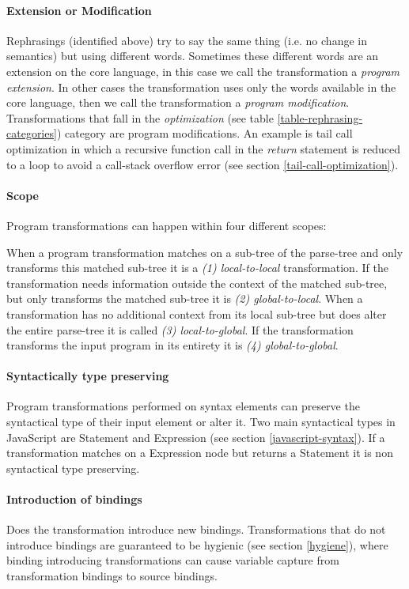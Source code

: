 \paragraph{Extension or Modification}
Rephrasings (identified above) try to say the same thing (i.e. no change in semantics) but using different words\cite{Visser2001}. Sometimes these different words are an extension on the core language, in this case we call the transformation a \textit{program extension}. In other cases the transformation uses only the words available in the core language, then we call the transformation a \textit{program modification}. Transformations that fall in the \textit{optimization} (see table \ref{table-rephrasing-categories}) category are program modifications. An example is tail call optimization in which a recursive function call in the \textit{return} statement is reduced to a loop to avoid a call-stack overflow error (see section \ref{tail-call-optimization}). 

\paragraph{Scope}
Program transformations can happen within four different scopes: 

When a program transformation matches on a sub-tree of the parse-tree and only transforms this matched sub-tree it is a \textit{(1) local-to-local} transformation. If the transformation needs information outside the context of the matched sub-tree, but only transforms the matched sub-tree it is \textit{(2) global-to-local}. When a transformation has no additional context from its local sub-tree but does alter the entire parse-tree it is called \textit{(3) local-to-global}. If the transformation transforms the input program in its entirety it is \textit{(4) global-to-global}.  

\paragraph{Syntactically type preserving}
Program transformations performed on syntax elements can preserve the syntactical type of their input element or alter it. Two main syntactical types in JavaScript are Statement and Expression (see section \ref{javascript-syntax}). If a transformation matches on a Expression node but returns a Statement it is non syntactical type preserving.

\paragraph{Introduction of bindings}
Does the transformation introduce new bindings. Transformations that do not introduce bindings are guaranteed to be hygienic (see section \ref{hygiene}), where binding introducing transformations can cause variable capture from transformation bindings to source bindings.

